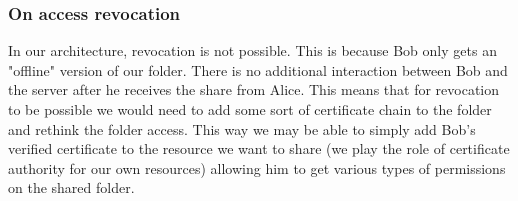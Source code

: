 \subsubsection{On access revocation}
In our architecture, revocation is not possible. This is because Bob only gets an "offline" version of our folder. There is no additional interaction between Bob and the server after he receives the share from Alice. This means that for revocation to be possible we would need to add some sort of certificate chain to the folder and rethink the folder access. This way we may be able to simply add Bob's verified certificate to the resource we want to share (we play the role of certificate authority for our own resources) allowing him to get various types of permissions on the shared folder. 